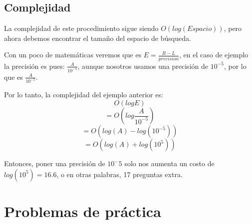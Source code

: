 \subsection{Complejidad}
La complejidad de este procedimiento sigue siendo \(O(log(Espacio))\), pero ahora debemos encontrar el tamaño del espacio de búsqueda. 

Con un poco de matemáticas veremos que es \(E=\frac{R-L}{precision}\), en el caso de ejemplo la precisión es pues: \(\frac{A}{10^{-4}}\), aunque nosotros usamos una precisión de \(10^{-5}\), por lo que es \(\frac{A}{10^{-5}}\).

Por lo tanto, la complejidad del ejemplo anterior es:
\[O(logE)\]
\[ = O(log\frac{A}{10^{-5}})\]
\[ = O(log(A)-log({10^{-5}}))\]
\[ = O(log(A)+log({10^{5}}))\]

Entonces, poner una precisión de \(10^-5\) solo nos aumenta un costo de \(log(10^5)=16.6\), o en otras palabras, 17 preguntas extra.

\section*{Problemas de práctica}

\begin{exercise}
\end{exercise}

\begin{exercise}
\end{exercise}

\begin{exercise}
\end{exercise}